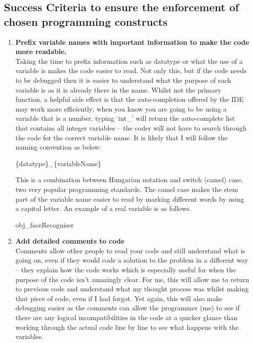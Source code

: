 \documentclass[9pt]{article}
\begin{document}
\begin{small}
	\subsection{Success Criteria to ensure the enforcement of chosen programming constructs}\label{sec_program}
	\begin{enumerate}
		\setlength{\itemsep}{4pt}
		\setlength{\parskip}{0pt}
		\item \textbf{Prefix variable names with important information to make the code more readable.} \\
		Taking the time to prefix information such as datatype or what the use of a variable is makes the code easier to read. Not only this, but if the code needs to be debugged then it is easier to understand what the purpose of each variable is as it is already there in the name. Whilst not the primary function, a helpful side effect is that the auto-completion offered by the IDE may work more efficiently; when you know you are going to be using a variable that is a number, typing `int\_’ will return the auto-complete list that contains all integer variables – the coder will not have to search through the code for the correct variable name. It is likely that I will follow the naming convention as below:
		\\\centerline{\{datatype\}\_\{variableName\}}
		This is a combination between Hungarian notation and switch (camel) case, two very popular programming standards. The camel case makes the stem part of the variable name easier to read by marking different words by using a capital letter. An example of a real variable is as follows.
		\\\centerline{obj\_faceRecogniser}
		\item \textbf{Add detailed comments to code} \\
		Comments allow other people to read your code and still understand what is going on, even if they would code a solution to the problem in a different way – they explain how the code works which is especially useful for when the purpose of the code isn’t amazingly clear. For me, this will allow me to return to previous code and understand what my thought process was whilst making that piece of code, even if I had forgot. Yet again, this will also make debugging easier as the comments can allow the programmer (me) to see if there are any logical incompatibilities in the code at a quicker glance than working through the actual code line by line to see what happens with the variables.

\end{enumerate}
\end{small}
\end{document}
